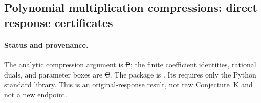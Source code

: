 \subsection{Polynomial multiplication compressions: direct response certificates}
\label{sec:response-moment-compressions}
\paragraph{Status and provenance.}
The analytic compression argument is \st{P}; the finite coefficient identities,
rational duals, and parameter boxes are \st{C}. The package is
.
Its  requires only the Python standard library.
This is an original-response result, not raw Conjecture~K and not a new endpoint.

